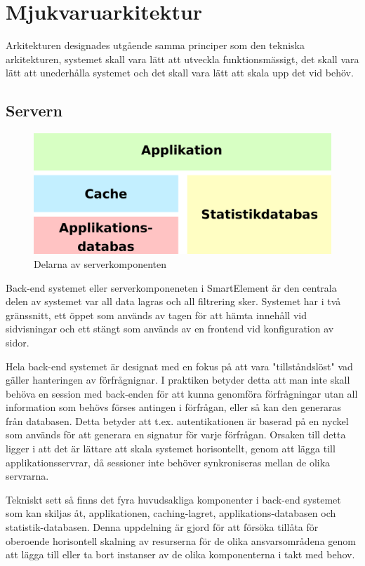 \section{Mjukvaruarkitektur}

Arkitekturen designades utgående samma principer som den tekniska arkitekturen, systemet skall vara lätt att utveckla funktionsmässigt, det skall vara lätt att unederhålla systemet och det skall vara lätt att skala upp det vid behöv.

\subsection{Servern}

\begin{figure}[h!]
\centering
\includegraphics[width=120mm]{assets/images/smelementbackendparts.png}
\caption{Delarna av serverkomponenten}
\label{abstractbackend}
\end{figure}

Back-end systemet eller serverkomponeneten i SmartElement är den centrala delen av systemet var all data lagras och all filtrering sker. Systemet har i två gränssnitt, ett öppet som används av tagen för att hämta innehåll vid sidvisningar och ett stängt som används av en frontend vid konfiguration av sidor.

Hela back-end systemet är designat med en fokus på att vara "tillståndslöst" vad gäller hanteringen av förfrågnignar. I praktiken betyder detta att man inte skall behöva en session med back-enden för att kunna genomföra förfrågningar utan all information som behövs förses antingen i förfrågan, eller så kan den generaras från databasen. Detta betyder att t.ex. autentikationen är baserad på en nyckel som används för att generara en signatur för varje förfrågan. Orsaken till detta ligger i att det är lättare att skala systemet horisontellt, genom att lägga till applikationsservrar, då sessioner inte behöver synkroniseras mellan de olika servrarna.

Tekniskt sett så finns det fyra huvudsakliga komponenter i back-end systemet som kan skiljas åt, applikationen, caching-lagret, applikations-databasen och statistik-databasen. Denna uppdelning är gjord för att försöka tillåta för oberoende horisontell skalning av resurserna för de olika ansvarsområdena genom att lägga till eller ta bort instanser av de olika komponenterna i takt med behov.


